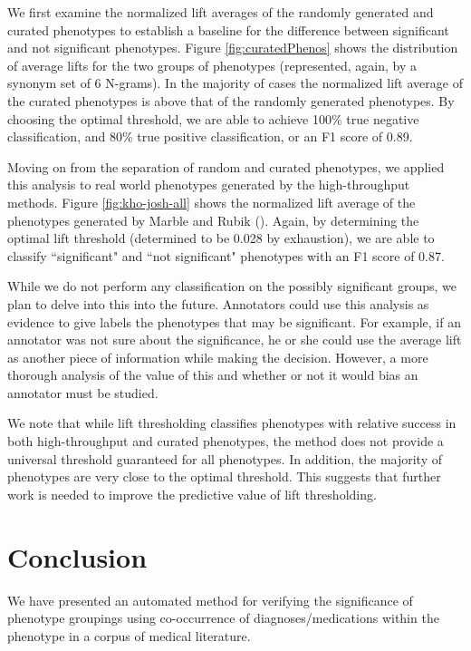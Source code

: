 \documentclass{sig-alternate}
\begin{document}
We first examine the normalized lift averages of the randomly generated and curated phenotypes to establish a baseline for the difference between significant and not significant phenotypes. Figure \ref{fig:curatedPhenos} shows the distribution of average lifts for the two groups of phenotypes (represented, again, by a synonym set of 6 N-grams). 
In the majority of cases the normalized lift average of the curated phenotypes is above that of the randomly generated phenotypes. 
By choosing the optimal threshold, we are able to achieve 100\% true negative classification, and 80\% true positive classification, or an F1 score of 0.89. 

Moving on from the separation of random and curated phenotypes, we applied this analysis to real world phenotypes generated by the high-throughput methods. Figure \ref{fig:kho-josh-all} shows the normalized lift average of the phenotypes generated by Marble and Rubik (\cite {Ho:2014jc,Ho:2014da, wang2015rubik}). 
Again, by determining the optimal lift threshold (determined to be 0.028 by exhaustion), we are able to classify ``significant" and ``not significant" phenotypes with an F1 score of 0.87. 

While we do not perform any classification on the possibly significant groups, we plan to delve into this into the future.
Annotators could use this analysis as evidence to give labels the phenotypes that may be significant.
For example, if an annotator was not sure about the significance, he or she could use the average lift as another piece of information while making the decision.
However, a more thorough analysis of the value of this and whether or not it would bias an annotator must be studied.

We note that while lift thresholding classifies phenotypes with relative success in both high-throughput and curated phenotypes, the method does not provide a universal threshold guaranteed for all phenotypes. In addition, the majority of phenotypes are very close to the optimal threshold. This suggests that further work is needed to improve the predictive value of lift thresholding.

\section{Conclusion}
We have presented an automated method for verifying the significance of phenotype groupings using co-occurrence of diagnoses/medications within the phenotype in a corpus of medical literature. 
\end{document}
